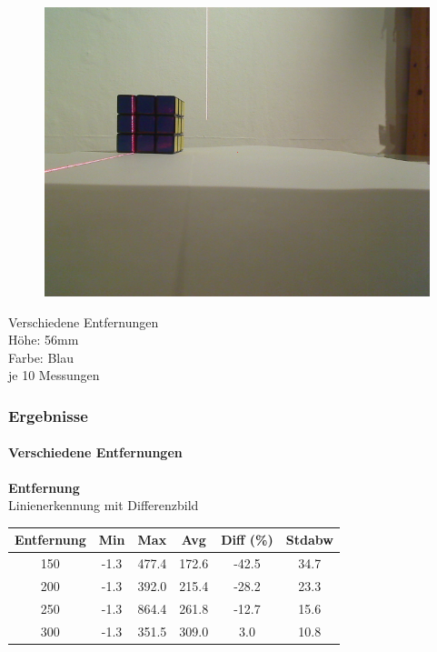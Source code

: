 \documentclass[xcolor=dvipsnames]{beamer}
\begin{document}
\begin{frame}
\begin{figure}
\begin{minipage}{0.32\linewidth}
		\end{minipage}
		\hfill
		\begin{minipage}{0.32\linewidth}
			\includegraphics[width=\linewidth]{includes/test_dist_3}
		\end{minipage}
	\end{figure}
	Verschiedene Entfernungen\\
	Höhe: 56mm\\
	Farbe: Blau\\
	je 10 Messungen
	
\end{frame}

\begin{frame}
	\frametitle{Ergebnisse}
	\framesubtitle{Verschiedene Entfernungen}
		\textbf{Entfernung}\\
		
		Linienerkennung mit Differenzbild
		\begin{tabular}{c|c|c|c|c|c}
			Entfernung & Min & Max & Avg & Diff (\%) & Stdabw\\ \hline
150 &      -1.3 & 477.4 & 172.6 & -42.5 & 34.7\\
200 &      -1.3 & 392.0 & 215.4 & -28.2 & 23.3\\
250 &      -1.3 & 864.4 & 261.8 & -12.7 & 15.6\\
300 &      -1.3 & 351.5 & 309.0 & 3.0 & 10.8\\

		\end{tabular}
		
		
\end{frame}
\end{document}
